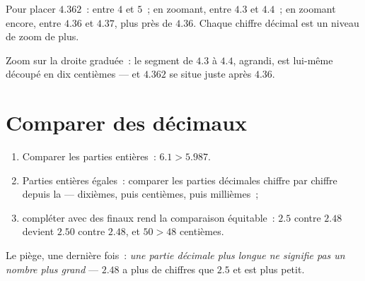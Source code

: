\begin{example}\label{ex:g5:decimals:line}
Pour placer $4.362$~: entre $4$ et $5$~; en zoomant, entre $4.3$ et
$4.4$~; en zoomant encore, entre $4.36$ et $4.37$, plus près de
$4.36$. Chaque chiffre décimal est un niveau de zoom de plus.
\end{example}

\begin{omfigure}

{\small Zoom sur la droite graduée~: le segment de $4.3$ à $4.4$,
agrandi, est lui-même découpé en dix centièmes --- et $4.362$ se
situe juste après $4.36$.}
\end{omfigure}

\section{Comparer des décimaux}

\begin{method}\label{met:g5:decimals:compare}
\begin{enumerate}
  \item Comparer les parties entières~: $6.1 > 5.987$.
  \item Parties entières égales~: comparer les parties décimales
        chiffre par chiffre depuis la  --- dixièmes, puis
        centièmes, puis millièmes~;
  \item compléter avec des  finaux rend la comparaison
        équitable~: $2.5$ contre $2.48$ devient $2.50$ contre
        $2.48$, et $50 > 48$ centièmes.
\end{enumerate}
Le piège, une dernière fois~: \emph{une partie décimale plus longue
ne signifie pas un nombre plus grand} --- $2.48$ a plus de chiffres
que $2.5$ et est plus petit.
\end{method}

